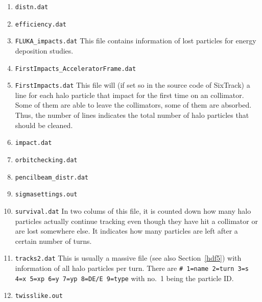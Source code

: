 \documentclass[a4paper, oneside, final]{scrartcl}
\begin{document}
{{\begin{enumerate}
\item \texttt{distn.dat}
\item \texttt{efficiency.dat} 

\item \texttt{FLUKA\_impacts.dat} This file contains information of lost particles for energy deposition studies. 

\item \texttt{FirstImpacts\_AcceleratorFrame.dat}
\item \texttt{FirstImpacts.dat} This file will (if set so in the source code of SixTrack) a line for each halo particle that impact for the first time on an collimator. Some of them are able to leave the collimators, some of them are absorbed. Thus, the number of lines indicates the total number of halo particles that should be cleaned.

\item \texttt{impact.dat}
\item \texttt{orbitchecking.dat}
\item \texttt{pencilbeam\_distr.dat}
\item \texttt{sigmasettings.out}
\item \texttt{survival.dat} In two colums of this file, it is counted down how many halo particles actually continue tracking even though they have hit a collimator or are lost somewhere else. It indicates how many particles are left after a certain number of turns.

\item \texttt{tracks2.dat} This is usually a massive file (see also Section~\ref{hdf5}) with information of all halo particles per turn. There are \texttt{\# 1=name 2=turn 3=s 4=x 5=xp 6=y 7=yp 8=DE/E 9=type} with no.~1 being the particle ID.
\item \texttt{twisslike.out}
\end{enumerate}


}}
\end{document}
